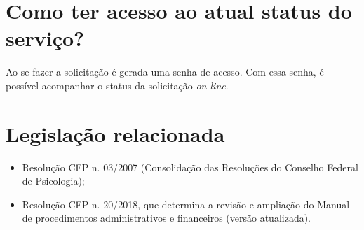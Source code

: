 \section*{Como ter acesso ao atual status do serviço?}

Ao se fazer a solicitação é gerada uma senha de acesso. Com essa senha, é possível acompanhar o status da solicitação \textit{on-line}.

\section{Legislação relacionada}

\begin{itemize}
\item	Resolução CFP n. 03/2007 (Consolidação das Resoluções do Conselho Federal de Psicologia);
\item	Resolução CFP n. 20/2018, que determina a revisão e ampliação do Manual de procedimentos administrativos e financeiros (versão atualizada).
\end{itemize}


